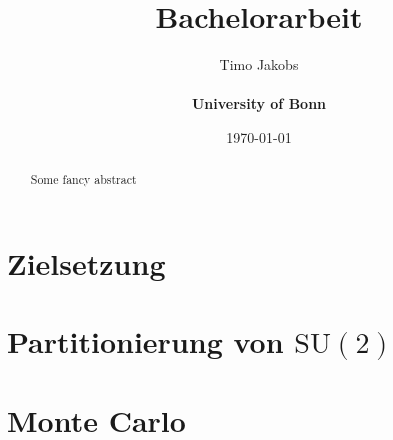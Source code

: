 \documentclass[a4paper]{scrartcl}
\title{Bachelorarbeit}
\author{Timo Jakobs \\\\ \textbf{University of Bonn}}
\date{\today}
\begin{document}
\maketitle

\begin{abstract}
Some fancy abstract
\end{abstract}

\tableofcontents
\newpage




\section{Zielsetzung}

\section{Partitionierung von $\mathrm{SU}(2)$}


\newpage
\section{Monte Carlo}


\printbibliography

\begin{appendix}

\end{appendix}
\end{document}
